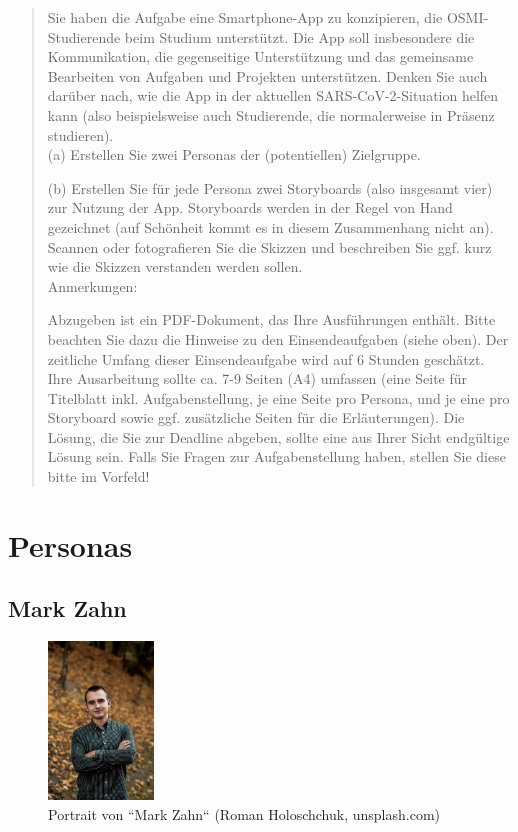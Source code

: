\documentclass{article}
\begin{document}
\begin{quote}
	Sie haben die Aufgabe eine Smartphone-App zu konzipieren, die OSMI-Studierende beim Studium unterstützt.
	Die App soll insbesondere die Kommunikation, die gegenseitige Unterstützung und das gemeinsame Bearbeiten
	von Aufgaben und Projekten unterstützen. Denken Sie auch darüber nach, wie die App in der aktuellen
	SARS-CoV-2-Situation helfen kann (also beispielsweise auch Studierende, die normalerweise in Präsenz studieren).
	\\[1em]
	(a) Erstellen Sie zwei Personas der (potentiellen) Zielgruppe.

	(b) Erstellen Sie für jede Persona zwei Storyboards (also insgesamt vier) zur Nutzung der App. Storyboards
	werden in der Regel von Hand gezeichnet (auf Schönheit kommt es in diesem Zusammenhang nicht an). Scannen
	oder fotografieren Sie die Skizzen und beschreiben Sie ggf. kurz wie die Skizzen verstanden werden sollen.
	\\[1em]
	Anmerkungen:

	Abzugeben ist ein PDF-Dokument, das Ihre Ausführungen enthält. Bitte beachten Sie dazu die Hinweise zu den
	Einsendeaufgaben (siehe oben). Der zeitliche Umfang dieser Einsendeaufgabe wird auf 6 Stunden geschätzt.
	Ihre Ausarbeitung sollte ca. 7-9 Seiten (A4) umfassen (eine Seite für Titelblatt inkl. Aufgabenstellung,
	je eine Seite pro Persona, und je eine pro Storyboard sowie ggf. zusätzliche Seiten für die Erläuterungen).
	Die Lösung, die Sie zur Deadline abgeben, sollte eine aus Ihrer Sicht endgültige Lösung sein. Falls Sie
	Fragen zur Aufgabenstellung haben, stellen Sie diese bitte im Vorfeld!
\end{quote}

\newpage

\section{Personas}

\subsection{Mark Zahn}

\begin{figure}[h]
	\includegraphics[width=0.25\textwidth]{mark}
	\centering
	\caption{Portrait von ``Mark Zahn`` (Roman Holoschchuk, unsplash.com)}
\end{figure}
\end{document}
